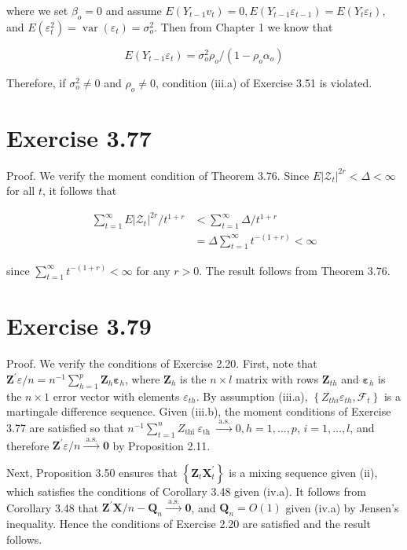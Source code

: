 \documentclass[10pt]{article}
\begin{document}
where we set $\beta_{o}=0$ and assume $E\left(Y_{t-1} v_{t}\right)=0, E\left(Y_{t-1} \varepsilon_{t-1}\right)=E\left(Y_{t} \varepsilon_{t}\right)$, and $E\left(\varepsilon_{t}^{2}\right)=\operatorname{var}\left(\varepsilon_{t}\right)=\sigma_{o}^{2}$. Then from Chapter 1 we know that

$$
E\left(Y_{t-1} \varepsilon_{t}\right)=\sigma_{o}^{2} \rho_{o} /\left(1-\rho_{o} \alpha_{o}\right)
$$

Therefore, if $\sigma_{o}^{2} \neq 0$ and $\rho_{o} \neq 0$, condition (iii.a) of Exercise 3.51 is violated.

\section*{Exercise 3.77}
Proof. We verify the moment condition of Theorem 3.76. Since $E\left|\mathcal{Z}_{t}\right|^{2 r}< \Delta<\infty$ for all $t$, it follows that

$$
\begin{aligned}
\sum_{t=1}^{\infty} E\left|\mathcal{Z}_{t}\right|^{2 r} / t^{1+r} & <\sum_{t=1}^{\infty} \Delta / t^{1+r} \\
& =\Delta \sum_{t=1}^{\infty} t^{-(1+r)}<\infty
\end{aligned}
$$

since $\sum_{t=1}^{\infty} t^{-(1+r)}<\infty$ for any $r>0$. The result follows from Theorem 3.76.

\section*{Exercise 3.79}
Proof. We verify the conditions of Exercise 2.20. First, note that $\mathbf{Z}^{\prime} \varepsilon / n= n^{-1} \sum_{h=1}^{p} \mathbf{Z}_{h} \boldsymbol{\varepsilon}_{h}$, where $\mathbf{Z}_{h}$ is the $n \times l$ matrix with rows $\mathbf{Z}_{t h}$ and $\boldsymbol{\varepsilon}_{h}$ is the $n \times 1$ error vector with elements $\varepsilon_{t h}$. By assumption (iii.a), $\left\{Z_{t h i} \varepsilon_{t h}, \mathcal{F}_{t}\right\}$ is a martingale difference sequence. Given (iii.b), the moment conditions of Exercise 3.77 are satisfied so that $n^{-1} \sum_{t=1}^{n} Z_{\text {thi }} \varepsilon_{\text {th }} \xrightarrow{\text { a.s. }} 0, h=1, \ldots, p$, $i=1, \ldots, l$, and therefore $\mathbf{Z}^{\prime} \varepsilon / n \xrightarrow{\text { a.s. }} \mathbf{0}$ by Proposition 2.11.

Next, Proposition 3.50 ensures that $\left\{\mathbf{Z}_{t} \mathbf{X}_{t}^{\prime}\right\}$ is a mixing sequence given (ii), which satisfies the conditions of Corollary 3.48 given (iv.a). It follows from Corollary 3.48 that $\mathbf{Z}^{\prime} \mathbf{X} / n-\mathbf{Q}_{n} \xrightarrow{\text { a.s. }} \mathbf{0}$, and $\mathbf{Q}_{n}=O(1)$ given (iv.a) by Jensen's inequality. Hence the conditions of Exercise 2.20 are satisfied and the result follows.
\end{document}
